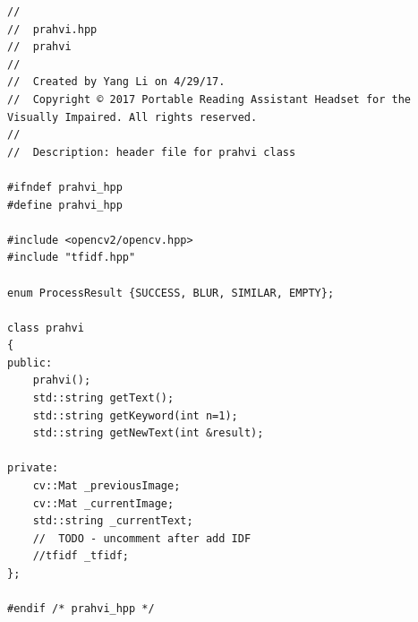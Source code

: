 \begin{lstlisting}
//
//  prahvi.hpp
//  prahvi
//
//  Created by Yang Li on 4/29/17.
//  Copyright © 2017 Portable Reading Assistant Headset for the Visually Impaired. All rights reserved.
//
//  Description: header file for prahvi class

#ifndef prahvi_hpp
#define prahvi_hpp

#include <opencv2/opencv.hpp>
#include "tfidf.hpp"

enum ProcessResult {SUCCESS, BLUR, SIMILAR, EMPTY};

class prahvi
{
public:
	prahvi();
	std::string getText();
	std::string getKeyword(int n=1);
	std::string getNewText(int &result);
	
private:
	cv::Mat _previousImage;
	cv::Mat _currentImage;
	std::string _currentText;
	//	TODO - uncomment after add IDF
	//tfidf _tfidf;
};

#endif /* prahvi_hpp */

\end{lstlisting}

